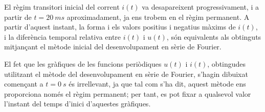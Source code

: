 \begin{exemple}
    El règim transitori inicial del corrent $i(t)$ va desapareixent progressivament, i a partir de $t=\qty{20}{ms}$ aproximadament, ja ens trobem en el règim permanent.
    A partir d'aquest instant, la forma i els valors positius i negatius màxims de $i(t)$, i la diferència temporal relativa entre $i(t)$ i $u(t)$, són equivalents als obtinguts mitjançant el mètode inicial del desenvolupament en sèrie de Fourier.

    El fet que les gràfiques de les funcions periòdiques $u(t)$ i  $i(t)$, obtingudes utilitzant el mètode del desenvolupament en sèrie de Fourier, s'hagin dibuixat començant a $t=\qty{0}{s}$ és irrellevant, ja que tal com s'ha dit,   aquest mètode ens proporciona només el règim permanent; per tant, es pot fixar a qualsevol valor l'instant del temps d'inici d'aquestes gràfiques.
\end{exemple}
